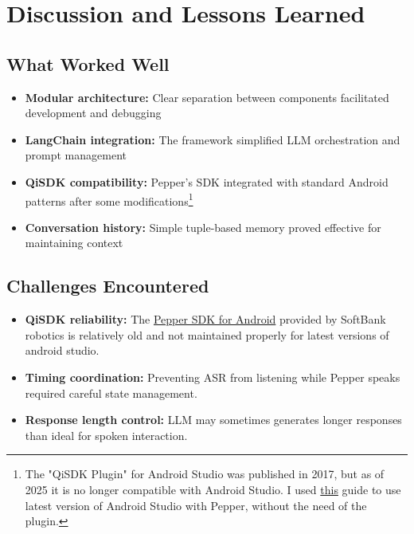 \documentclass[a4paper]{article}
\begin{document}
\section{Discussion and Lessons Learned}

\subsection{What Worked Well}

\begin{itemize}[noitemsep]
    \item \textbf{Modular architecture:} Clear separation between components facilitated development and debugging
    \item \textbf{LangChain integration:} The framework simplified LLM orchestration and prompt management
    \item \textbf{QiSDK compatibility:} Pepper's SDK integrated with standard Android patterns after some modifications\footnote{The "QiSDK Plugin" for Android Studio was published in 2017, but as of 2025 it is no longer compatible with Android Studio. I used \href{https://github.com/unitedroboticsgroup-france/MyPepperApplication?tab=readme-ov-file\#pepper-with-android-studio-in-2024}{this} guide to use latest version of Android Studio with Pepper, without the need of the plugin.}
    \item \textbf{Conversation history:} Simple tuple-based memory proved effective for maintaining context
\end{itemize}

\subsection{Challenges Encountered}

\begin{itemize}[noitemsep]
    \item \textbf{QiSDK reliability:} The \href{https://qisdk.softbankrobotics.com/sdk/doc/pepper-sdk/index.html}{Pepper SDK for Android} provided by SoftBank robotics is relatively old and not maintained properly for latest versions of android studio.
    \item \textbf{Timing coordination:} Preventing ASR from listening while Pepper speaks required careful state management.
    \item \textbf{Response length control:} LLM may sometimes generates longer responses than ideal for spoken interaction.
\end{itemize}
\end{document}
